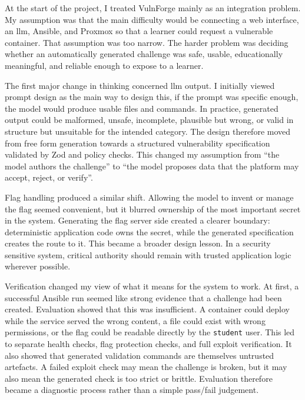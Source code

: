 
At the start of the project, I treated VulnForge mainly as an integration problem. My assumption was that the main difficulty would be connecting a web interface, an \gls{llm}, Ansible, and Proxmox so that a learner could request a vulnerable container. That assumption was too narrow. The harder problem was deciding whether an automatically generated challenge was safe, usable, educationally meaningful, and reliable enough to expose to a learner.

The first major change in thinking concerned \gls{llm} output. I initially viewed prompt design as the main way to design this, if the prompt was specific enough, the model would produce usable files and commands. In practice, generated output could be malformed, unsafe, incomplete, plausible but wrong, or valid in structure but unsuitable for the intended category. The design therefore moved from free form generation towards a structured vulnerability specification validated by Zod and policy checks. This changed my assumption from ``the model authors the challenge'' to ``the model proposes data that the platform may accept, reject, or verify''.

Flag handling produced a similar shift. Allowing the model to invent or manage the flag seemed convenient, but it blurred ownership of the most important secret in the system. Generating the flag server side created a clearer boundary: deterministic application code owns the secret, while the generated specification creates the route to it. This became a broader design lesson. In a security sensitive system, critical authority should remain with trusted application logic wherever possible.

Verification changed my view of what it means for the system to work. At first, a successful Ansible run seemed like strong evidence that a challenge had been created. Evaluation showed that this was insufficient. A container could deploy while the service served the wrong content, a file could exist with wrong permissions, or the flag could be readable directly by the \lstinline|student| user. This led to separate health checks, flag protection checks, and full exploit verification. It also showed that generated validation commands are themselves untrusted artefacts. A failed exploit check may mean the challenge is broken, but it may also mean the generated check is too strict or brittle. Evaluation therefore became a diagnostic process rather than a simple pass/fail judgement.

